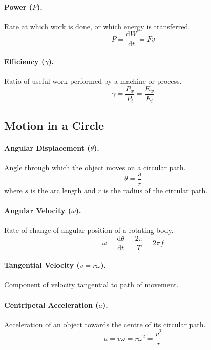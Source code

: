 \documentclass{article}
\begin{document}
\paragraph{Power ($P$).} Rate at which work is done, or which energy is transferred. \begin{equation}
P = \frac{\mathrm{d}W}{\mathrm{d}t} = Fv
\end{equation}

\paragraph{Efficiency ($\gamma$).} Ratio of useful work performed by a machine or process. \begin{equation}
\gamma = \frac{P_w}{P_i} = \frac{E_w}{E_i}
\end{equation}

\subsection{Motion in a Circle}

\paragraph{Angular Displacement ($\theta$).} Angle through which the object moves on a circular path. \begin{equation}
\theta = \frac{s}{r}
\end{equation} where $s$ is the arc length and $r$ is the radius of the circular path.

\paragraph{Angular Velocity ($\omega$).} Rate of change of angular position of a rotating body. \begin{equation}
\omega = \frac{\mathrm{d}\theta}{\mathrm{d}t} = \frac{2\pi}{T} = 2\pi f
\end{equation}

\paragraph{Tangential Velocity ($v = r\omega$).} Component of velocity tangential to path of movement.

\paragraph{Centripetal Acceleration ($a$).} Acceleration of an object towards the centre of its circular path. \begin{equation}
a = v\omega = r\omega^2 = \frac{v^2}{r}
\end{equation}
\end{document}
